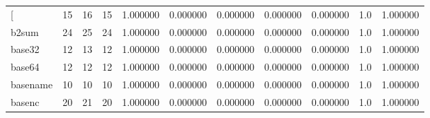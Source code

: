 \begin{longtable}{lrrrrrrrrrr}
\bottomrule
\endlastfoot
{[}         &                                      15 &                 16 &                                15 &                                   1.000000 &                               0.000000 &                                     0.000000 &                          0.000000 &                                0.000000 &                                1.0 &                                           1.000000 \\
b2sum     &                                      24 &                 25 &                                24 &                                   1.000000 &                               0.000000 &                                     0.000000 &                          0.000000 &                                0.000000 &                                1.0 &                                           1.000000 \\
base32    &                                      12 &                 13 &                                12 &                                   1.000000 &                               0.000000 &                                     0.000000 &                          0.000000 &                                0.000000 &                                1.0 &                                           1.000000 \\
base64    &                                      12 &                 12 &                                12 &                                   1.000000 &                               0.000000 &                                     0.000000 &                          0.000000 &                                0.000000 &                                1.0 &                                           1.000000 \\
basename  &                                      10 &                 10 &                                10 &                                   1.000000 &                               0.000000 &                                     0.000000 &                          0.000000 &                                0.000000 &                                1.0 &                                           1.000000 \\
basenc    &                                      20 &                 21 &                                20 &                                   1.000000 &                               0.000000 &                                     0.000000 &                          0.000000 &                                0.000000 &                                1.0 &                                           1.000000 \\

\end{longtable}
